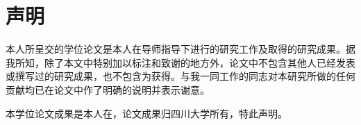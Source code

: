 \chapter{声明}
\label{Chap_OriginalStatement}
本人所呈交的学位论文是本人在导师指导下进行的研究工作及取得的研究成果。据我所知，除了本文中特别加以标注和致谢的地方外，论文中不包含其他人已经发表或撰写过的研究成果，也不包含为获得。与我一同工作的同志对本研究所做的任何贡献均已在论文中作了明确的说明并表示谢意。


本学位论文成果是本人在，论文成果归四川大学所有，特此声明。
\vspace{4cm}
\autograph
